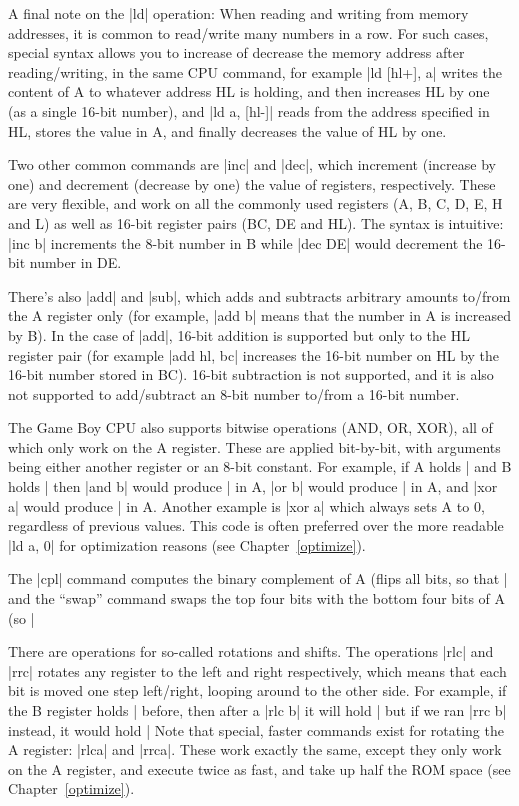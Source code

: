 \documentclass[11pt]{book}
\begin{document}
A final note on the |ld| operation: When reading and writing from memory addresses, it is common to read/write many numbers in a row. For such cases, special syntax allows you to increase of decrease the memory address after reading/writing, in the same CPU command, for example |ld [hl+], a| writes the content of A to whatever address HL is holding, and then increases HL by one (as a single 16-bit number), and |ld a, [hl-]| reads from the address specified in HL, stores the value in A, and finally decreases the value of HL by one. 

Two other common commands are |inc| and |dec|, which increment (increase by one) and decrement (decrease by one) the value of registers, respectively. These are very flexible, and work on all the commonly used registers (A, B, C, D, E, H and L) as well as 16-bit register pairs (BC, DE and HL). The syntax is intuitive: |inc b| increments the 8-bit number in B while |dec DE| would decrement the 16-bit number in DE.

There’s also |add| and |sub|, which adds and subtracts arbitrary amounts to/from the A register only (for example, |add b| means that the number in A is increased by B). In the case of |add|, 16-bit addition is supported but only to the HL register pair (for example |add hl, bc| increases the 16-bit number on HL by the 16-bit number stored in BC). 16-bit subtraction is not supported, and it is also not supported to add/subtract an 8-bit number to/from a 16-bit number. 

The Game Boy CPU also supports bitwise operations (AND, OR, XOR), all of which only work on the A register. These are applied bit-by-bit, with arguments being either another register or an 8-bit constant. For example, if A holds |%
 and B holds |%
 then |and b| would produce |%
 in A, |or b| would produce |%
 in A, and |xor a| would produce |%
 in A. Another example is |xor a| which always sets A to 0, regardless of previous values. This code is often preferred over the more readable |ld a, 0| for optimization reasons (see Chapter~\ref{optimize}).

The |cpl| command computes the binary complement of A (flips all bits, so that |%
and the “swap” command swaps the top four bits with the bottom four bits of A (so |%

There are operations for so-called rotations and shifts. The operations |rlc| and |rrc| rotates any register to the left and right respectively, which means that each bit is moved one step left/right, looping around to the other side. For example, if the B register holds |%
before, then after a |rlc b| it will hold |%
but if we ran |rrc b| instead, it would hold |%
Note that special, faster commands exist for rotating the A register: |rlca| and |rrca|. These work exactly the same, except they only work on the A register, and execute twice as fast, and take up half the ROM space (see Chapter~\ref{optimize}). 
\end{document}
